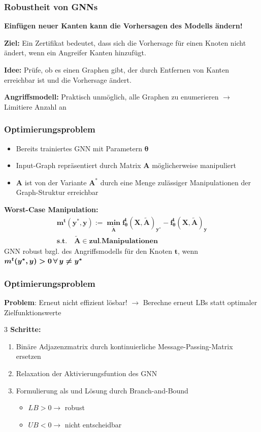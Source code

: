 \documentclass{beamer}
\begin{document}
\begin{frame}
  \frametitle{Robustheit von GNNs}

  \textbf{Einfügen neuer Kanten kann die Vorhersagen des Modells ändern!}

  \textbf{Ziel:} Ein Zertifikat bedeutet, dass sich die Vorhersage für einen Knoten
  nicht ändert, wenn ein Angreifer Kanten hinzufügt.

  \textbf{Idee:} Prüfe, ob es einen Graphen gibt, der durch Entfernen von Kanten erreichbar ist und die Vorhersage ändert.

  \textbf{Angriffsmodell:} Praktisch unmöglich, alle Graphen zu enumerieren $\rightarrow$ Limitiere Anzahl an   
\end{frame}

\begin{frame}
  \frametitle{Optimierungsproblem}
  \begin{itemize}
    \item Bereits trainiertes GNN mit Parametern $\boldsymbol{\theta}$
    \item Input-Graph repräsentiert durch Matrix $\boldsymbol{A}$ möglicherweise manipuliert
    \item $\boldsymbol{A}$ ist von der  Variante $\boldsymbol{A^{\ast}}$ durch eine Menge zulässiger Manipulationen der Graph-Struktur erreichbar
  \end{itemize}
  \textbf{Worst-Case Manipulation:}
  \begin{gather}
    \boldsymbol{m^t (y^*, y) := \min_{\tilde{A}} f_{\theta}^t(X, \tilde{A})_{y^*} - f_{\theta}^t(X, \tilde{A})_y} \nonumber \\
    \boldsymbol{s.t. \quad \tilde{A} \in zul. Manipulationen} \nonumber
\end{gather}
  GNN robust bzgl. des Angriffsmodells für den Knoten $\boldsymbol{t}$, wenn $\boldsymbol{m^t (y^*, y) > 0 \thinspace \forall \thinspace y \neq y^{\ast}}$
\end{frame}

\begin{frame}
  \frametitle{Optimierungsproblem}
  \textbf{Problem}: Erneut nicht effizient lösbar!\newline
  $\rightarrow$ Berechne erneut LBs statt optimaler Zielfunktionswerte\newline

  \textbf{$3$ Schritte:}
  \begin{enumerate}
    \item Binäre Adjazenzmatrix durch kontinuierliche Message-Passing-Matrix ersetzen
    \item Relaxation der Aktivierungsfuntion des GNN
    \item Formulierung als  und Lösung durch Branch-and-Bound
    \begin{itemize}
      \item $LB > 0 \rightarrow$ robust
      \item $UB < 0 \rightarrow$ nicht entscheidbar
    \end{itemize}
  \end{enumerate}
\end{frame}
\end{document}
